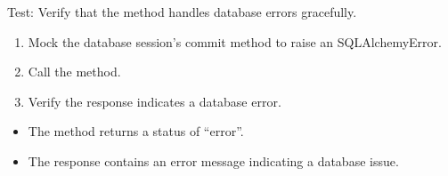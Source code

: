 \documentclass[letterpaper,10pt,english]{sphinxmanual}
\begin{document}
\begin{fulllineitems}
\label{\detokenize{test:test.test_admin.test_update_admin_email_database_error}}
\pysigstartsignatures
\pysiglinewithargsret
{}
{\sphinxparamcomma {}}
{}
\pysigstopsignatures
\sphinxAtStartPar
Test: Verify that the method handles database errors gracefully.
\begin{description}
\begin{enumerate}
%
\item {} 
\sphinxAtStartPar
Mock the database session’s commit method to raise an SQLAlchemyError.

\item {} 
\sphinxAtStartPar
Call the  method.

\item {} 
\sphinxAtStartPar
Verify the response indicates a database error.

\end{enumerate}

\begin{itemize}
\item {} 
\sphinxAtStartPar
The method returns a status of “error”.

\item {} 
\sphinxAtStartPar
The response contains an error message indicating a database issue.

\end{itemize}

\end{description}

\end{fulllineitems}

\end{document}
